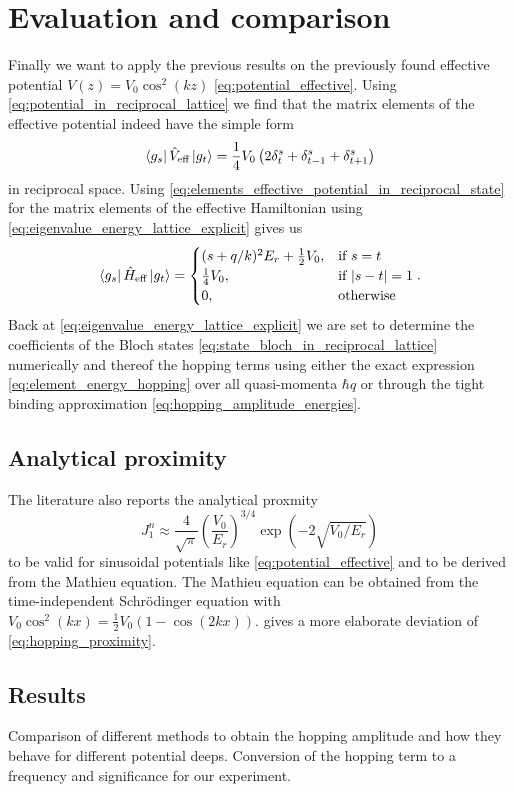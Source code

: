 \section{Evaluation and comparison}

Finally we want to apply the previous results on the previously found
effective potential $V(z)=V_0\cos^2(kz)$ \cref{eq:potential_effective}. Using
\cref{eq:potential_in_reciprocal_lattice} we find that the matrix elements of
the effective potential indeed have the simple form
\begin{equation}
  \bra{g_s}\hat{V}_\text{eff}\ket{g_t}
  =\frac{1}{4}V_0\left(2\delta^s_t+\delta^s_{t-1}+\delta^s_{t+1}\right)
  \label{eq:elements_effective_potential_in_reciprocal_state}
\end{equation}
in reciprocal space. Using
\cref{eq:elements_effective_potential_in_reciprocal_state} for the matrix
elements of the effective Hamiltonian using
\cref{eq:eigenvalue_energy_lattice_explicit} gives us
\begin{equation}
  \bra{g_s}\hat{H}_\text{eff}\ket{g_t}
  =\begin{cases}
    (s+q/k)^2E_r+\frac{1}{2}V_0, & \text{if }s=t\\
    \frac{1}{4}V_0, & \text{if } \abs{s-t}=1\\
    0, & \text{otherwise}
  \end{cases}.
\end{equation}
Back at \cref{eq:eigenvalue_energy_lattice_explicit} we are set to determine
the coefficients of the Bloch states
\cref{eq:state_bloch_in_reciprocal_lattice} numerically and thereof the
hopping terms using either the exact expression
\cref{eq:element_energy_hopping} over all quasi-momenta $\hbar q$ or through
the tight binding approximation \cref{eq:hopping_amplitude_energies}.

\subsection{Analytical proximity}

The literature \cite{Bloch2008} also reports the analytical proxmity
\begin{equation}
  J^n_1\approx
  \frac{4}{\sqrt{\pi}}\left(\frac{V_0}{E_r}\right)^{3/4}\exp(-2\sqrt{V_0/E_r})
  \label{eq:hopping_proximity}
\end{equation}
to be valid for sinusoidal potentials like \cref{eq:potential_effective} and
to be derived from the Mathieu equation. The Mathieu equation can be obtained
from the time-independent Schrödinger equation with
$V_0\cos^2(kx)=\frac{1}{2}V_0\left(1-\cos(2kx)\right)$. \cite{Connor1984}
gives a more elaborate deviation of \cref{eq:hopping_proximity}.

\subsection{Results}

Comparison of different methods to obtain the hopping amplitude and how
they behave for different potential deeps. Conversion of the hopping term to
a frequency and significance for our experiment.
